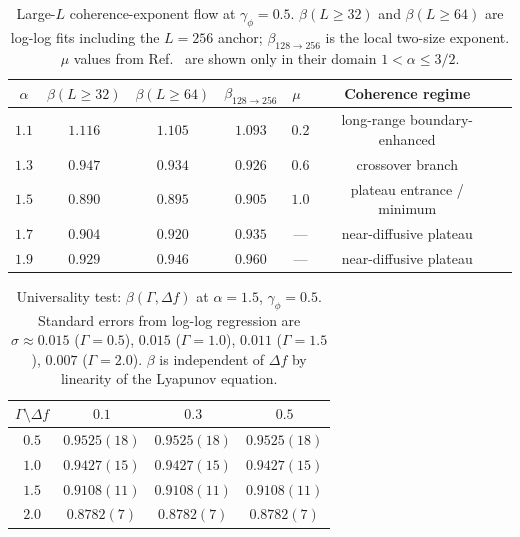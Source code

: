 \documentclass[aps,prd,twocolumn,superscriptaddress,floatfix]{revtex4-2}
\begin{document}

\begin{table}[t]
\caption{Large-$L$ coherence-exponent flow at $\gamma_\phi = 0.5$.
$\beta(L{\geq}32)$ and $\beta(L{\geq}64)$ are log-log fits including
the $L=256$ anchor; $\beta_{128\to256}$ is the local two-size
exponent. $\mu$ values from Ref.~\cite{Dhawan2024} are shown only in
their domain $1 < \alpha \leq 3/2$.}
\label{tab:beta_largeL}
\begin{ruledtabular}
\begin{tabular}{c|cccc|c|l}
$\alpha$ & $\beta(L{\geq}32)$ & $\beta(L{\geq}64)$ & $\beta_{128\to256}$ & $\mu$~\cite{Dhawan2024} & Coherence regime \\
\hline
$1.1$ & $1.116$ & $1.105$ & $1.093$ & $0.2$ & long-range boundary-enhanced \\
$1.3$ & $0.947$ & $0.934$ & $0.926$ & $0.6$ & crossover branch \\
$1.5$ & $0.890$ & $0.895$ & $0.905$ & $1.0$ & plateau entrance / minimum \\
$1.7$ & $0.904$ & $0.920$ & $0.935$ & --- & near-diffusive plateau \\
$1.9$ & $0.929$ & $0.946$ & $0.960$ & --- & near-diffusive plateau \\
\end{tabular}
\end{ruledtabular}
\end{table}


\begin{table}[t]
\caption{Universality test: $\beta(\Gamma, \Delta f)$ at
$\alpha = 1.5$, $\gamma_\phi = 0.5$. Standard errors from log-log
regression are $\sigma \approx 0.015$ ($\Gamma = 0.5$), $0.015$
($\Gamma = 1.0$), $0.011$ ($\Gamma = 1.5$), $0.007$
($\Gamma = 2.0$). $\beta$ is independent of $\Delta f$ by linearity
of the Lyapunov equation.}
\label{tab:universality}
\begin{ruledtabular}
\begin{tabular}{c|ccc}
$\Gamma \setminus \Delta f$ & $0.1$ & $0.3$ & $0.5$ \\
\hline
$0.5$ & $0.9525(18)$ & $0.9525(18)$ & $0.9525(18)$ \\
$1.0$ & $0.9427(15)$ & $0.9427(15)$ & $0.9427(15)$ \\
$1.5$ & $0.9108(11)$ & $0.9108(11)$ & $0.9108(11)$ \\
$2.0$ & $0.8782(7)$  & $0.8782(7)$  & $0.8782(7)$ \\
\end{tabular}
\end{ruledtabular}
\end{table}
\end{document}

